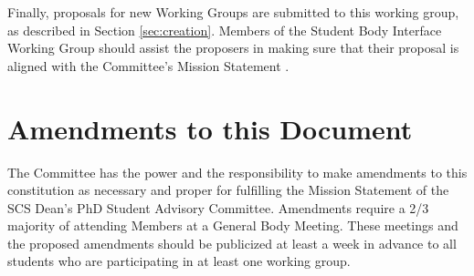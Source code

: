 \documentclass{article}
\begin{document}
Finally, proposals for new Working Groups are submitted to this working group, as described in Section \ref{sec:creation}. Members of the Student Body Interface Working Group should assist the proposers in making sure that their proposal is aligned with the Committee's Mission Statement .


\section{Amendments to this Document}
The Committee has the power and the responsibility to make amendments to this constitution as necessary and proper for fulfilling the Mission Statement of the SCS Dean's PhD Student Advisory Committee. Amendments require a 2/3 majority of attending Members at a General Body Meeting. These meetings and the proposed amendments should be publicized at least a week in advance to all students who are participating in at least one working group. 
\end{document}
